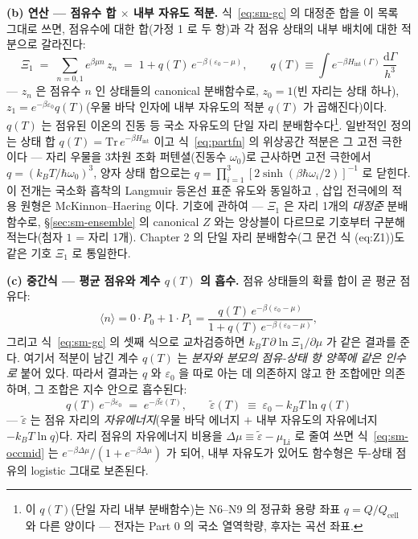 \documentclass[11pt,a4paper]{article}
\newcommand{\dd}{\mathrm{d}}
\newcommand{\cell}{\mathrm{cell}}
\begin{document}
\textbf{(b) 연산 --- 점유수 합 $\times$ 내부 자유도 적분.} 식~\eqref{eq:sm-gc} 의 대정준 합을 이 목록
그대로 쓰면, 점유수에 대한 합(가정 1 로 두 항)과 각 점유 상태의 내부 배치에 대한 적분으로 갈라진다:
\begin{equation}
\Xi_1\;=\;\sum_{n=0,1}e^{\beta\mu n}\,z_n
\;=\;1+q(T)\,e^{-\beta(\varepsilon_0-\mu)},
\qquad
q(T)\equiv\int e^{-\beta H_\mathrm{int}(\Gamma)}\,\frac{\dd\Gamma}{h^3}
\label{eq:partfn}
\end{equation}
--- $z_n$ 은 점유수 $n$ 인 상태들의 canonical 분배함수로, $z_0=1$(빈 자리는 상태 하나),
$z_1=e^{-\beta\varepsilon_0}q(T)$(우물 바닥 인자에 내부 자유도의 적분 $q(T)$ 가 곱해진다)이다.
$q(T)$ 는 점유된 이온의 진동 등 국소 자유도의 단일 자리 분배함수다\footnote{이 $q(T)$(단일 자리 내부 분배함수)는 N6--N9 의 정규화 용량 좌표 $q{=}Q/Q_\cell$ 와 다른 양이다 --- 전자는 Part 0 의 국소 열역학량, 후자는 곡선 좌표.}. 일반적인 정의는 상태
합 $q(T)=\mathrm{Tr}\,e^{-\beta H_\mathrm{int}}$ 이고 식~\eqref{eq:partfn} 의 위상공간 적분은 그 고전
극한이다 — 자리 우물을 3차원 조화 퍼텐셜(진동수 $\omega_0$)로 근사하면 고전 극한에서
$q=(k_BT/\hbar\omega_0)^3$, 양자 상태 합으로는
$q=\prod_{i=1}^{3}[2\sinh(\beta\hbar\omega_i/2)]^{-1}$ 로 닫힌다. 이 전개는 국소화
흡착의 Langmuir 등온선 표준 유도와 동일하고 \cite{hill1960,fowler1939,mcquarrie1976}, 삽입 전극에의
적용 원형은 McKinnon--Haering \cite{mckinnon1983} 이다. 기호에 관하여 --- $\Xi_1$ 은 자리 1개의
\emph{대정준} 분배함수로, \S\ref{sec:sm-ensemble} 의 canonical $Z$ 와는 앙상블이 다르므로 기호부터
구분해 적는다(첨자 $1$ = 자리 1개). Chapter 2 의 단일 자리 분배함수(그 문건 식 (eq:Z1))도 같은 기호
$\Xi_1$ 로 통일한다.

\textbf{(c) 중간식 --- 평균 점유와 계수 $q(T)$ 의 흡수.} 점유 상태들의 확률 합이 곧 평균 점유다:
\begin{equation}
\langle n\rangle=0\cdot P_0+1\cdot P_1
=\frac{q(T)\,e^{-\beta(\varepsilon_0-\mu)}}{1+q(T)\,e^{-\beta(\varepsilon_0-\mu)}},
\label{eq:sm-occmid}
\end{equation}
그리고 식~\eqref{eq:sm-gc} 의 셋째 식으로 교차검증하면 $k_BT\,\partial\ln\Xi_1/\partial\mu$ 가 같은
결과를 준다. 여기서 적분이 남긴 계수 $q(T)$ 는 \emph{분자와 분모의 점유-상태 항 양쪽에 같은 인수로}
붙어 있다. 따라서 결과는 $q$ 와 $\varepsilon_0$ 을 따로 아는 데 의존하지 않고 한 조합에만 의존하며,
그 조합은 지수 안으로 흡수된다:
\begin{equation}
q(T)\,e^{-\beta\varepsilon_0}\;=\;e^{-\beta\tilde\varepsilon(T)},
\qquad
\tilde\varepsilon(T)\;\equiv\;\varepsilon_0-k_BT\ln q(T)
\label{eq:sm-epstilde}
\end{equation}
--- $\tilde\varepsilon$ 는 점유 자리의 \emph{자유에너지}(우물 바닥 에너지 $+$ 내부 자유도의 자유에너지
$-k_BT\ln q$)다. 자리 점유의 자유에너지 비용을 $\Delta\mu\equiv\tilde\varepsilon-\mu_\mathrm{Li}$ 로
줄여 쓰면 식~\eqref{eq:sm-occmid} 는 $e^{-\beta\Delta\mu}/(1+e^{-\beta\Delta\mu})$ 가 되어, 내부
자유도가 있어도 함수형은 두-상태 점유의 logistic 그대로 보존된다.
\end{document}
